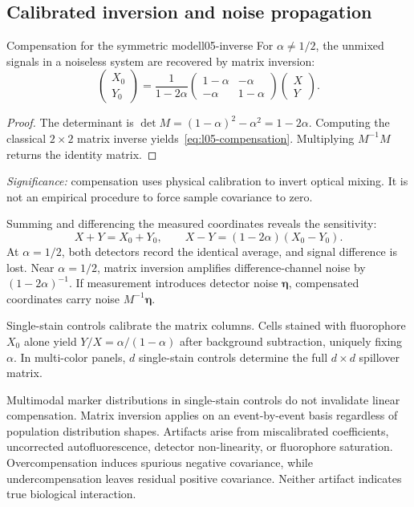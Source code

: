 \subsection{Calibrated inversion and noise propagation}
\label{subsec:l05-inverse}
\begin{proposition}{Compensation for the symmetric model}{l05-inverse}
For $\alpha\neq1/2$, the unmixed signals in a noiseless system are recovered by matrix inversion:
\begin{equation}
\begin{pmatrix}X_0\\Y_0\end{pmatrix}
=\frac1{1-2\alpha}
\begin{pmatrix}1-\alpha&-\alpha\\-\alpha&1-\alpha\end{pmatrix}
\begin{pmatrix}X\\Y\end{pmatrix}.
\label{eq:l05-compensation}
\end{equation}
\end{proposition}
\begin{proof}
The determinant is $\det M = (1-\alpha)^2-\alpha^2=1-2\alpha$. Computing the classical $2\times2$ matrix inverse yields~\eqref{eq:l05-compensation}. Multiplying $M^{-1}M$ returns the identity matrix.
\end{proof}
\textit{Significance:} compensation uses physical calibration to invert optical mixing. It is not an empirical procedure to force sample covariance to zero.

Summing and differencing the measured coordinates reveals the sensitivity:
\begin{equation}
X+Y=X_0+Y_0,\qquad X-Y=(1-2\alpha)(X_0-Y_0).
\label{eq:l05-sum-difference}
\end{equation}
At $\alpha=1/2$, both detectors record the identical average, and signal difference is lost. Near $\alpha=1/2$, matrix inversion amplifies difference-channel noise by $(1-2\alpha)^{-1}$. If measurement introduces detector noise $\bm{\eta}$, compensated coordinates carry noise $M^{-1}\bm{\eta}$.

Single-stain controls calibrate the matrix columns. Cells stained with fluorophore $X_0$ alone yield $Y/X=\alpha/(1-\alpha)$ after background subtraction, uniquely fixing $\alpha$. In multi-color panels, $d$ single-stain controls determine the full $d\times d$ spillover matrix.

\begin{remark}
Multimodal marker distributions in single-stain controls do not invalidate linear compensation. Matrix inversion applies on an event-by-event basis regardless of population distribution shapes. Artifacts arise from miscalibrated coefficients, uncorrected autofluorescence, detector non-linearity, or fluorophore saturation. Overcompensation induces spurious negative covariance, while undercompensation leaves residual positive covariance. Neither artifact indicates true biological interaction.
\end{remark}

